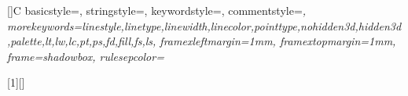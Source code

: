 \newenvironment{history}
{
 \begin{framed}
  \begin{minipage}{0.9\textwidth}
   { \footnotesize
    Historic remark:
   }
}
{
  \end{minipage}
 \end{framed}  
}


[]{C}{
  basicstyle=\small,
  stringstyle=\color{red},
  keywordstyle=\color{blue},
  commentstyle=\color{grey}\slshape,
  morekeywords={linestyle,linetype,linewidth,linecolor,pointtype,nohidden3d,hidden3d,palette,lt,lw,lc,pt,ps,fd,fill,fs,ls},
  framexleftmargin=1mm, framextopmargin=1mm, frame=shadowbox,
  rulesepcolor=\color{grey}
}
    
    
[1][]{
\lstset{
 language=cCCode,#1
}}{}
    
    